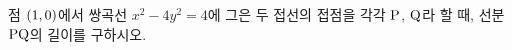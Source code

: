 점 $(1{,}\mkern3mu\mathopen{}0)$에서 쌍곡선 $x^2-4y^2=4$에 그은 두 접선의 접점을 각각 $\mathrm{P}$, $\mathrm{Q}$라 할 때, 선분 $\mathrm{PQ}$의 길이를 구하시오.
